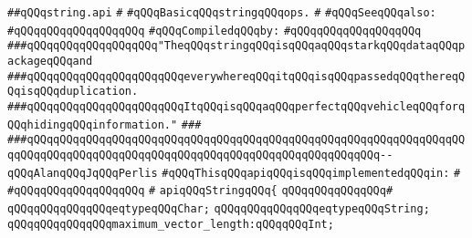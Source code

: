 \label{src/lib/std/src/string.api}
\verb|##qQQqstring.api|\newline
\verb|#|\newline
\verb|#qQQqBasicqQQqstringqQQqops.|\newline
\verb|#|\newline
\verb|#qQQqSeeqQQqalso:|\newline
\verb|#qQQqqQQqqQQqqQQqqQQq|\newline
\newline
\verb|#qQQqCompiledqQQqby:|\newline
\verb|#qQQqqQQqqQQqqQQqqQQq|\newline
\newline
\newline
\newline
\verb|###qQQqqQQqqQQqqQQqqQQq"TheqQQqstringqQQqisqQQqaqQQqstarkqQQqdataqQQqpackageqQQqand|\newline
\verb|###qQQqqQQqqQQqqQQqqQQqqQQqeverywhereqQQqitqQQqisqQQqpassedqQQqthereqQQqisqQQqduplication.|\newline
\verb|###qQQqqQQqqQQqqQQqqQQqqQQqItqQQqisqQQqaqQQqperfectqQQqvehicleqQQqforqQQqhidingqQQqinformation."|\newline
\verb|###|\newline
\verb|###qQQqqQQqqQQqqQQqqQQqqQQqqQQqqQQqqQQqqQQqqQQqqQQqqQQqqQQqqQQqqQQqqQQqqQQqqQQqqQQqqQQqqQQqqQQqqQQqqQQqqQQqqQQqqQQqqQQqqQQqqQQq--qQQqAlanqQQqJqQQqPerlis|\newline
\newline
\newline
\newline
\verb|#qQQqThisqQQqapiqQQqisqQQqimplementedqQQqin:|\newline
\verb|#|\newline
\verb|#qQQqqQQqqQQqqQQqqQQq|\newline
\verb|#|\newline
\verb|apiqQQqStringqQQq{|\newline
\verb|qQQqqQQqqQQqqQQq#|\newline
\verb|qQQqqQQqqQQqqQQqeqtypeqQQqChar;|\newline
\verb|qQQqqQQqqQQqqQQqeqtypeqQQqString;|\newline
\newline
\verb|qQQqqQQqqQQqqQQqmaximum_vector_length:qQQqqQQqInt;|\newline
